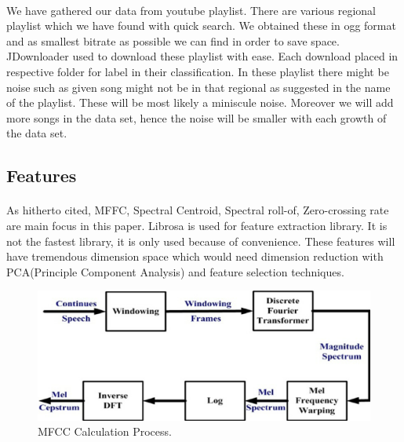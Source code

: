 \documentclass[10pt,twocolumn,letterpaper]{article}
\begin{document}
\paragraph{}We have gathered our data from youtube playlist. There are various regional playlist which we have found with quick search\cite{data_set}. We obtained these in ogg format and as smallest bitrate as possible we can find in order to save space. JDownloader\cite{jdownloader} used to download these playlist with ease. Each download placed in respective folder for label in their classification. In these playlist there might be noise such as given song might not be in that regional as suggested in the name of the playlist. These will be most likely a miniscule noise. Moreover we will add more songs in the data set, hence the noise will be smaller with each growth of the data set. 

\subsection{Features}
\paragraph{}As hitherto cited, MFFC, Spectral Centroid, Spectral roll-of, Zero-crossing rate\cite{genre_classification_tp} are main focus in this paper. Librosa\cite{librosa} is used for feature extraction library. It is not the fastest library, it is only used because of convenience. These features will have tremendous dimension space which would need dimension reduction with PCA(Principle Component Analysis) and feature selection techniques. 
\begin{figure}[t]
  \begin{center}
  \includegraphics[width=0.8\linewidth]{images/mfcc_calc.png}
  \end{center}  
     \caption{MFCC Calculation Process.\cite{mfcc_calc}}
  \label{fig:mffc}
  \label{fig:onecol}
\end{figure}
\end{document}
